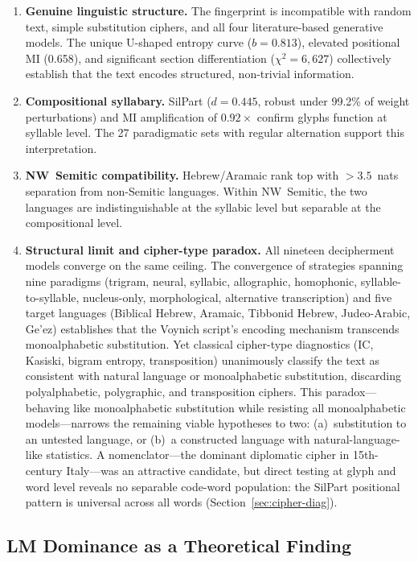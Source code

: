 \begin{enumerate}[nosep]
  \item \textbf{Genuine linguistic structure.}  The fingerprint is incompatible with random text, simple substitution ciphers, and all four literature-based generative models.  The unique U-shaped entropy curve ($b = 0.813$), elevated positional MI (0.658), and significant section differentiation ($\chi^2 = 6{,}627$) collectively establish that the text encodes structured, non-trivial information.
  \item \textbf{Compositional syllabary.}  SilPart ($d = 0.445$, robust under 99.2\% of weight perturbations) and MI amplification of $0.92\times$ confirm glyphs function at syllable level.  The 27 paradigmatic sets with regular alternation support this interpretation.
  \item \textbf{NW~Semitic compatibility.}  Hebrew/Aramaic rank top with $> 3.5$~nats separation from non-Semitic languages.  Within NW~Semitic, the two languages are indistinguishable at the syllabic level but separable at the compositional level.
  \item[\textbf{--}] \textbf{Structural limit and cipher-type paradox.}  All nineteen decipherment models converge on the same ceiling.  The convergence of strategies spanning nine paradigms (trigram, neural, syllabic, allographic, homophonic, syllable-to-syllable, nucleus-only, morphological, alternative transcription) and five target languages (Biblical Hebrew, Aramaic, Tibbonid Hebrew, Judeo-Arabic, Ge'ez) establishes that the Voynich script's encoding mechanism transcends monoalphabetic substitution.  Yet classical cipher-type diagnostics (IC, Kasiski, bigram entropy, transposition) unanimously classify the text as consistent with natural language or monoalphabetic substitution, discarding polyalphabetic, polygraphic, and transposition ciphers.  This paradox---behaving like monoalphabetic substitution while resisting all monoalphabetic models---narrows the remaining viable hypotheses to two: (a)~substitution to an untested language, or (b)~a constructed language with natural-language-like statistics.  A nomenclator---the dominant diplomatic cipher in 15th-century Italy---was an attractive candidate, but direct testing at glyph and word level reveals no separable code-word population: the SilPart positional pattern is universal across all words (Section~\ref{sec:cipher-diag}).
\end{enumerate}

\subsection{LM Dominance as a Theoretical Finding}

